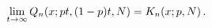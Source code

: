 \[\lim_{t\to\infty}\mathop{Q_{n}\/}\nolimits\!\left(x;pt,(1-p)t,N\right)=\mathop%
{K_{n}\/}\nolimits\!\left(x;p,N\right).\]